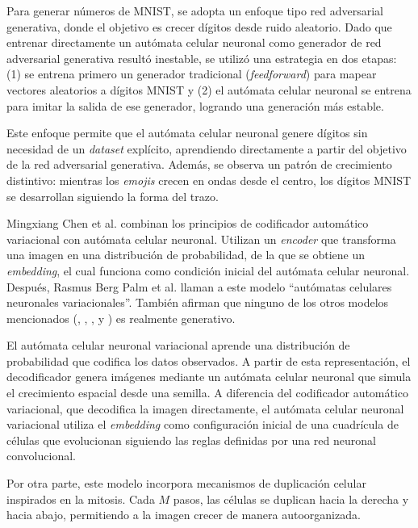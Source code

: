 Para generar números de MNIST, se adopta un enfoque tipo red adversarial generativa, donde el objetivo es crecer dígitos desde ruido aleatorio. Dado que entrenar directamente un autómata celular neuronal como generador de red adversarial generativa resultó inestable, se utilizó una estrategia en dos etapas: (1) se entrena primero un generador tradicional (\textit{feedforward}) para mapear vectores aleatorios a dígitos MNIST y (2) el autómata celular neuronal se entrena para imitar la salida de ese generador, logrando una generación más estable.

Este enfoque permite que el autómata celular neuronal genere dígitos sin necesidad de un \textit{dataset} explícito, aprendiendo directamente a partir del objetivo de la red adversarial generativa. Además, se observa un patrón de crecimiento distintivo: mientras los \textit{emojis} crecen en ondas desde el centro, los dígitos MNIST se desarrollan siguiendo la forma del trazo.

Mingxiang Chen et al. \cite{chen2020_vaenca} combinan los principios de codificador automático variacional con autómata celular neuronal. Utilizan un \textit{encoder} que transforma una imagen en una distribución de probabilidad, de la que se obtiene un \textit{embedding}, el cual funciona como condición inicial del autómata celular neuronal. Después, Rasmus Berg Palm et al. \cite{rasmus2022_vnca} llaman a este modelo ``autómatas celulares neuronales variacionales''. También afirman que ninguno de los otros modelos mencionados (\cite{mordvintsev2020_nca}, \cite{hernandez2021_ncam}, \cite{zhang2021_gca}, \cite{horibe2021_softrobot} y \cite{frans2021_stampca}) es realmente generativo.

El autómata celular neuronal variacional aprende una distribución de probabilidad que codifica los datos observados. A partir de esta representación, el decodificador genera imágenes mediante un autómata celular neuronal que simula el crecimiento espacial desde una semilla. A diferencia del codificador automático variacional, que decodifica la imagen directamente, el autómata celular neuronal variacional utiliza el \textit{embedding} como configuración inicial de una cuadrícula de células que evolucionan siguiendo las reglas definidas por una red neuronal convolucional. 

Por otra parte, este modelo incorpora mecanismos de duplicación celular inspirados en la mitosis. Cada $M$ pasos, las células se duplican hacia la derecha y hacia abajo, permitiendo a la imagen crecer de manera autoorganizada. 

